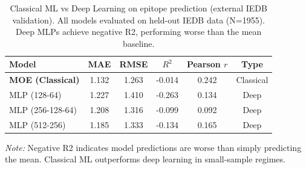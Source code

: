 \begin{table}[htbp]
\centering
\caption{Classical ML vs Deep Learning on epitope prediction (external IEDB validation). All models evaluated on held-out IEDB data (N=1955). Deep MLPs achieve negative R2, performing worse than the mean baseline.}
\label{tab:dl_comparison}
\begin{tabular}{lccccc}
\toprule
Model & MAE & RMSE & $R^2$ & Pearson $r$ & Type \\
\midrule
\textbf{MOE (Classical)} & 1.132 & 1.263 & -0.014 & 0.242 & Classical \\
MLP (128-64) & 1.227 & 1.410 & -0.263 & 0.134 & Deep \\
MLP (256-128-64) & 1.208 & 1.316 & -0.099 & 0.092 & Deep \\
MLP (512-256) & 1.185 & 1.333 & -0.134 & 0.165 & Deep \\
\bottomrule
\end{tabular}
\footnotesize {\textit{Note:} Negative R2 indicates model predictions are worse than simply predicting the mean. Classical ML outperforms deep learning in small-sample regimes.}
\end{table}
